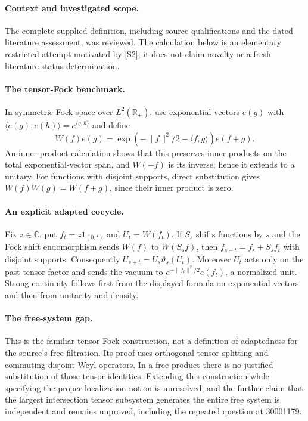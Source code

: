 \documentclass[11pt]{article}
\begin{document}
\paragraph{Context and investigated scope.} The complete supplied definition, including source qualifications and the dated literature assessment, was reviewed. The calculation below is an elementary restricted attempt motivated by [S2]; it does not claim novelty or a fresh literature-status determination.

\paragraph{The tensor-Fock benchmark.} In symmetric Fock space over $L^2(\mathbb R_+)$, use exponential vectors $e(g)$ with $\langle e(g),e(h)\rangle=e^{\langle g,h\rangle}$ and define
\[
 W(f)e(g)=\exp(-\|f\|^2/2-\langle f,g\rangle)e(f+g).
\]
An inner-product calculation shows that this preserves inner products on the total exponential-vector span, and $W(-f)$ is its inverse; hence it extends to a unitary. For functions with disjoint supports, direct substitution gives $W(f)W(g)=W(f+g)$, since their inner product is zero.

\paragraph{An explicit adapted cocycle.} Fix $z\in\mathbb C$, put $f_t=z1_{(0,t)}$ and $U_t=W(f_t)$. If $S_s$ shifts functions by $s$ and the Fock shift endomorphism sends $W(f)$ to $W(S_sf)$, then $f_{s+t}=f_s+S_sf_t$ with disjoint supports. Consequently $U_{s+t}=U_s\vartheta_s(U_t)$. Moreover $U_t$ acts only on the past tensor factor and sends the vacuum to $e^{-\|f_t\|^2/2}e(f_t)$, a normalized unit. Strong continuity follows first from the displayed formula on exponential vectors and then from unitarity and density.

\paragraph{The free-system gap.} This is the familiar tensor-Fock construction, not a definition of adaptedness for the source's free filtration. Its proof uses orthogonal tensor splitting and commuting disjoint Weyl operators. In a free product there is no justified substitution of those tensor identities. Extending this construction while specifying the proper localization notion is unresolved, and the further claim that the largest intersection tensor subsystem generates the entire free system is independent and remains unproved, including the repeated question at 30001179.
\end{document}
